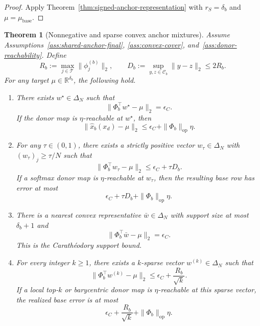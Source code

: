 \documentclass{article}
\theoremstyle{plain}
\newtheorem{theorem}{Theorem}[section]
\theoremstyle{definition}
\theoremstyle{remark}
\begin{document}
\begin{proof}
Apply Theorem~\ref{thm:signed-anchor-representation} with $r_S=\delta_b$ and $\mu=\mu_{\mathrm{base}}$.
\end{proof}

\begin{theorem}[Nonnegative and sparse convex anchor mixtures]
\label{thm:convex-anchor-mixtures}
Assume Assumptions~\ref{ass:shared-anchor-final}, \ref{ass:convex-cover}, and~\ref{ass:donor-reachability}. Define
\[
R_b:=\max_{j\in\mathcal{T}}\|\phi_j^{(b)}\|_2,
\qquad
D_b:=\sup_{y,z\in\mathcal{C}_b}\|y-z\|_2\le 2R_b.
\]
For any target $\mu\in\mathbb{R}^{\delta_b}$, the following hold.
\begin{enumerate}[leftmargin=*]
\item There exists $w^\star\in\Delta_N$ such that
\[
\|\Phi_b^\top w^\star-\mu\|_2=\epsilon_C.
\]
If the donor map is $\eta$-reachable at $w^\star$, then
\[
\|\widehat{x}_b(x_d)-\mu\|_2
\le
\epsilon_C+
\|\Phi_b\|_{\mathrm{op}}\eta.
\]
\item For any $\tau\in(0,1)$, there exists a strictly positive vector $w_\tau\in\Delta_N$ with $(w_\tau)_j\ge \tau/N$ such that
\[
\|\Phi_b^\top w_\tau-\mu\|_2
\le
\epsilon_C+\tau D_b.
\]
If a softmax donor map is $\eta$-reachable at $w_\tau$, then the resulting base row has error at most
\[
\epsilon_C+\tau D_b+
\|\Phi_b\|_{\mathrm{op}}\eta.
\]
\item There is a nearest convex representative $\bar w\in\Delta_N$ with support size at most $\delta_b+1$ and
\[
\|\Phi_b^\top\bar w-\mu\|_2=\epsilon_C.
\]
This is the Carath\'eodory support bound.
\item For every integer $k\ge 1$, there exists a $k$-sparse vector $w^{(k)}\in\Delta_N$ such that
\[
\|\Phi_b^\top w^{(k)}-\mu\|_2
\le
\epsilon_C+\frac{R_b}{\sqrt{k}}.
\]
If a local top-$k$ or barycentric donor map is $\eta$-reachable at this sparse vector, the realized base error is at most
\[
\epsilon_C+\frac{R_b}{\sqrt{k}}+
\|\Phi_b\|_{\mathrm{op}}\eta.
\]
\end{enumerate}
\end{theorem}
\end{document}
